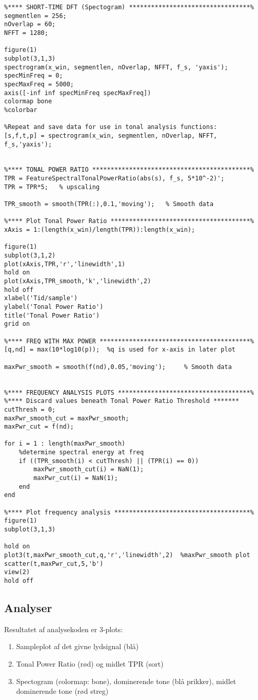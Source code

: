 \begin{verbatim}
%**** SHORT-TIME DFT (Spectogram) *********************************%
segmentlen = 256;
nOverlap = 60;
NFFT = 1280;

figure(1)
subplot(3,1,3)
spectrogram(x_win, segmentlen, nOverlap, NFFT, f_s, 'yaxis');
specMinFreq = 0;
specMaxFreq = 5000;
axis([-inf inf specMinFreq specMaxFreq])
colormap bone
%colorbar

%Repeat and save data for use in tonal analysis functions:
[s,f,t,p] = spectrogram(x_win, segmentlen, nOverlap, NFFT, f_s,'yaxis'); 


%**** TONAL POWER RATIO *******************************************% 
TPR = FeatureSpectralTonalPowerRatio(abs(s), f_s, 5*10^-2)';
TPR = TPR*5;   % upscaling

TPR_smooth = smooth(TPR(:),0.1,'moving');   % Smooth data

%**** Plot Tonal Power Ratio **************************************%
xAxis = 1:(length(x_win)/length(TPR)):length(x_win);

figure(1)
subplot(3,1,2)
plot(xAxis,TPR,'r','linewidth',1)
hold on
plot(xAxis,TPR_smooth,'k','linewidth',2)
hold off
xlabel('Tid/sample')
ylabel('Tonal Power Ratio')
title('Tonal Power Ratio')
grid on

%**** FREQ WITH MAX POWER *****************************************%
[q,nd] = max(10*log10(p));  %q is used for x-axis in later plot

maxPwr_smooth = smooth(f(nd),0.05,'moving');     % Smooth data


%**** FREQUENCY ANALYSIS PLOTS ************************************%
%**** Discard values beneath Tonal Power Ratio Threshold *******
cutThresh = 0;
maxPwr_smooth_cut = maxPwr_smooth;
maxPwr_cut = f(nd);

for i = 1 : length(maxPwr_smooth)
    %determine spectral energy at freq
    if ((TPR_smooth(i) < cutThresh) || (TPR(i) == 0))
        maxPwr_smooth_cut(i) = NaN(1);
        maxPwr_cut(i) = NaN(1);
    end
end

%**** Plot frequency analysis *************************************%
figure(1)
subplot(3,1,3)

hold on
plot3(t,maxPwr_smooth_cut,q,'r','linewidth',2)  %maxPwr_smooth plot
scatter(t,maxPwr_cut,5,'b')
view(2)
hold off

\end{verbatim}

\newpage
\subsection{Analyser}
Resultatet af analysekoden er 3-plots:
\begin{enumerate}
	\item Sampleplot af det givne lydsignal (blå)
	\item Tonal Power Ratio (rød) og midlet TPR (sort)
	\item Spectogram (colormap: bone), dominerende tone (blå prikker), midlet dominerende tone (rød streg)
\end{enumerate}

